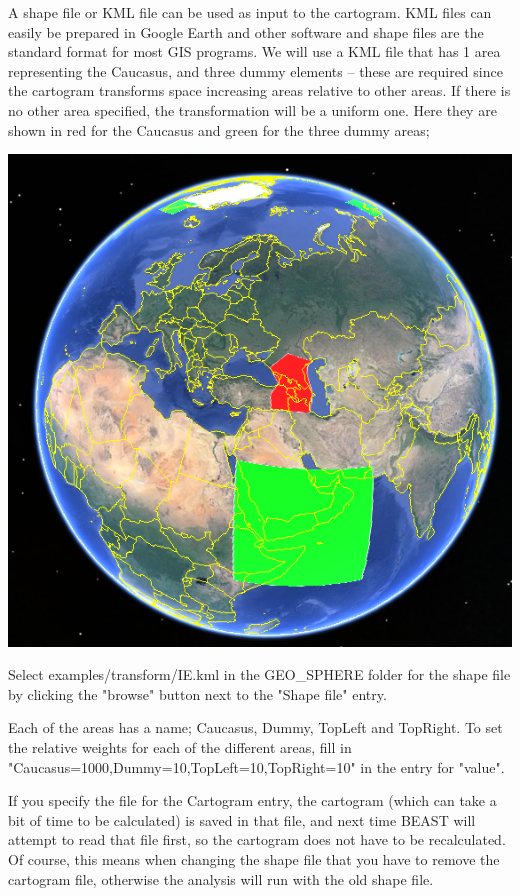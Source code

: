 \documentclass{article}
\def\beast-geo{GEO\_SPHERE}
\begin{document}
A shape file or KML file can be used as input to the cartogram. KML files can easily be prepared in Google Earth and other software and shape files are the standard format for most GIS programs. We will use a KML file that has 1 area representing the Caucasus, and three dummy elements -- these are required since the cartogram transforms space increasing areas relative to other areas. If there is no other area specified, the transformation will be a uniform one. Here they are shown in red for the Caucasus and green for the three dummy areas;

\begin{center}
\includegraphics[scale=0.4]{figures/IEmap.png}
\end{center}

Select examples/transform/IE.kml in the \beast-geo{} folder for the shape file by clicking the "browse" button next to the "Shape file" entry.

Each of the areas has a name; Caucasus, Dummy, TopLeft and TopRight. To set the relative weights for each of the different areas, fill in\\ "Caucasus=1000,Dummy=10,TopLeft=10,TopRight=10" in the entry for "value". 

If you specify the file for the Cartogram entry, the cartogram (which can take a bit of time to be calculated) is saved in that file, and next time BEAST will attempt to read that file first, so the cartogram does not have to be recalculated. Of course, this means when changing the shape file that you have to remove the cartogram file, otherwise the analysis will run with the old shape file.
\end{document}
